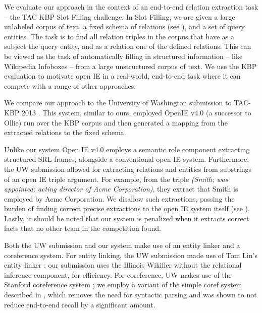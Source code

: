 We evaluate our approach in the context of an end-to-end relation extraction
  task -- the TAC KBP Slot Filling challenge.
In Slot Filling, we are given a large unlabeled corpus of text, a fixed
  schema of relations (see ), and a set of
  query entities.
The task is to find all relation triples in the corpus that have as a subject
  the query entity, and as a relation one of the defined relations.
This can be viewed as the task of automatically filling in structured information
  -- like Wikipedia Infoboxes -- from a large unstructured corpus of text.
We use the KBP evaluation to motivate open IE in a real-world, end-to-end task
  where it can compete with a range of other approaches.

We compare our approach to the University of Washington submission to
  TAC-KBP 2013 \cite{key:2013soderland-kbp}.
This system, similar to ours, employed OpenIE v4.0 (a successor to Ollie) 
  run over
  the KBP corpus and then generated a mapping from the extracted relations to
  the fixed schema.

Unlike our system Open IE v4.0 employs a semantic role
  component extracting structured SRL frames, alongside a conventional
  open IE system.
Furthermore, the UW submission allowed for extracting relations and entities
  from substrings of an open IE triple argument.
For example, from the triple \textit{(Smith; was appointed; acting director of Acme
  Corporation)}, they extract that Smith is employed by Acme Corporation.
We disallow such extractions, passing the burden of finding correct
  precise extractions to the open IE system itself (see ).
Lastly, it should be noted that our system is penalized when it extracts
  correct facts that no other team in the competition found.

Both the UW submission and our system make use of an entity linker
  and a coreference system.
For entity linking, the UW submission made use of Tom Lin's entity linker
  \cite{key:2012lin-el}; our submission uses the Illinois Wikifier 
  \cite{key:2011ratinov-el} without the relational inference component, for
  efficiency.
For coreference, UW makes use of the Stanford coreference system
  \cite{key:stanford-coref}; we employ a variant of the simple coref system
  described in \cite{key:2014pink-kbp}, which removes the need for syntactic
  parsing and was shown to not reduce end-to-end recall by a significant
  amount.


